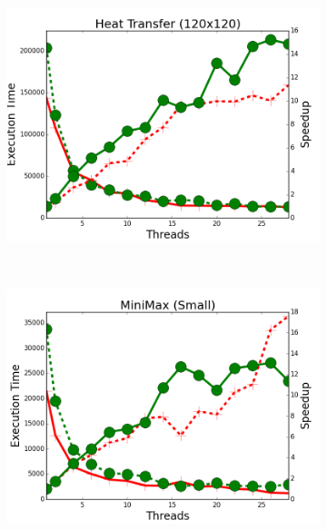 \begin{figure}[h]
        ~
        \begin{subfigure}[b]{\smallplotsize\textwidth}
                \includegraphics[width=\textwidth]{experiments/scalability/no-refs-allocator-new-heat-transfer-120.png}
                \label{fig:implementation:no_refs_ht}
        \end{subfigure}
        ~
        \begin{subfigure}[b]{\smallplotsize\textwidth}
                \includegraphics[width=\textwidth]{experiments/scalability/no-refs-allocator-min-max-tictactoe-small.png}
                \label{fig:implementation:no_refs_minimax}
        \end{subfigure}
        ~
        \begin{subfigure}[b]{\smallplotsize\textwidth}

\end{subfigure}
\end{figure}
